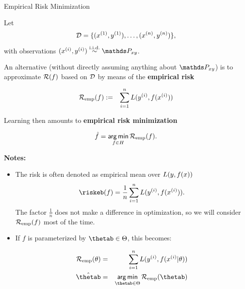 \begin{vbframe}{Empirical Risk Minimization}

Let 
$$
\mathcal{D} = \{ (x^{(1)}, y^{(1)}), \ldots, (x^{(n)}, y^{(n)})\},
$$
with observations $\xyi \overset{\text{i.i.d.}}{\sim}\Pxy$.

\vspace{0.2cm}

An alternative (without directly assuming anything about $\P_{xy}$) is to approximate $\mathcal{R}(f)$ based on $\mathcal{D}$ by means of the \textbf{empirical risk}

\vspace*{-0.2cm}

\begin{eqnarray*}
\mathcal{R}_{\text{emp}}(f) &:=& \sum_{i=1}^n L(y^{(i)}, f(x^{(i)}))
\end{eqnarray*}

Learning then amounts to \textbf{empirical risk minimization}

$$
\hat{f} = \mathop{\sf arg\,min}_{f \in H} \mathcal{R}_{\text{emp}}(f).
$$

\framebreak 

\textbf{Notes: }

\begin{itemize}
  \item The risk is often denoted as empirical mean over $L(y, f(x))$
  $$
    \riskeb(f) = \frac{1}{n}\sumin \Lxyi. 
  $$
  The factor $\frac{1}{n}$ does not make a difference in optimization, so we will consider $\mathcal{R}_{\text{emp}}(f)$ most of the time.
  \item If $f$ is parameterized by $\thetab \in \Theta$, this becomes:

  \begin{eqnarray*}
  \risket & = & \sumin \Lxyit \cr
  \hat{\thetab} & = & \argmin_{\thetab \in \Theta} \riske(\thetab)
  \end{eqnarray*}

\end{itemize}

\end{vbframe}




